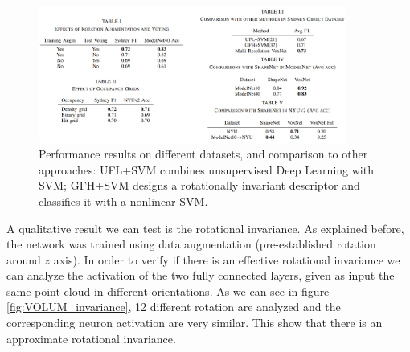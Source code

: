 \begin{figure}[ht]
    \centering
    \captionsetup{width=.9\linewidth}
    \includegraphics[width=0.9\textwidth]{images/VOLUM_results_table.png}
    \caption{Performance results on different datasets, and comparison to other approaches: UFL+SVM combines unsupervised Deep Learning with SVM; GFH+SVM designs a rotationally invariant descriptor and classifies it with a nonlinear SVM.}
    \label{fig:VOLUM_results_table}
\end{figure}

A qualitative result we can test is the rotational invariance. As explained before, the network was trained using data augmentation (pre-established rotation around $z$ axis). In order to verify if there is an effective rotational invariance we can analyze the activation of the two fully connected layers, given as input the same point cloud in different orientations. As we can see in figure \ref{fig:VOLUM_invariance}, 12 different rotation are analyzed and the corresponding neuron activation are very similar. This show that there is an approximate rotational invariance.